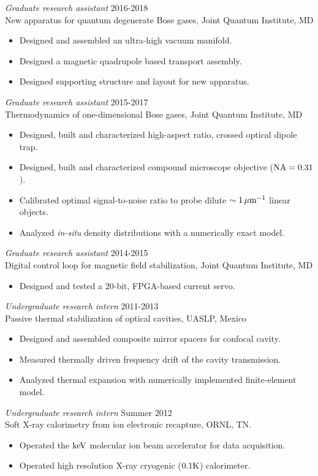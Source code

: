 \documentclass[margin]{res} %
\begin{document}
\begin{resume}
{\sl Graduate research assistant} \hfill 2016-2018 \\
New apparatus for quantum degenerate Bose gases, Joint Quantum Institute, MD
\begin{itemize} \itemsep -2pt
\item Designed and assembled an ultra-high vacuum manifold.
\item Designed a magnetic quadrupole based transport assembly.
\item Designed supporting structure and layout for new apparatus.
\end{itemize} 

{\sl Graduate research assistant} \hfill 2015-2017 \\
Thermodynamics of one-dimensional Bose gases, Joint Quantum Institute, MD
\begin{itemize} \itemsep -2pt
\item Designed, built and characterized high-aspect ratio, crossed optical dipole trap.
\item Designed, built and characterized compound microscope objective (${{\rm NA} = 0.31}$).
\item Calibrated optimal signal-to-noise ratio to probe dilute ${\sim 1 \,{\rm \mu m ^{-1}}}$ linear objects.
\item Analyzed {\it in-situ} density distributions with a numerically exact model.
\end{itemize} 

{\sl Graduate research assistant} \hfill 2014-2015 \\
Digital control loop for magnetic field stabilization, Joint Quantum Institute, MD
\begin{itemize} \itemsep -2pt
\item Designed and tested a 20-bit, FPGA-based current servo.
\end{itemize} 

{\sl Undergraduate research intern} \hfill 2011-2013 \\
Passive thermal stabilization of optical cavities, UASLP, Mexico 
\begin{itemize} \itemsep -2pt
\item Designed and assembled composite mirror spacers for confocal cavity.
\item Measured thermally driven frequency drift of the cavity transmission. 
\item Analyzed thermal expansion with numerically implemented finite-element model.
\end{itemize}
 
{\sl Undergraduate research intern} \hfill Summer 2012 \\
Soft X-ray calorimetry from ion electronic recapture, ORNL, TN.
\begin{itemize} \itemsep -2pt
\item Operated the ${{\rm keV}}$ molecular ion beam accelerator for data acquisition.
\item Operated high resolution X-ray cryogenic (${0.1 {\rm K}}$) calorimeter.
\end{itemize}

\end{resume}
\end{document}
